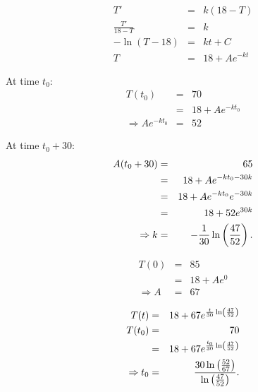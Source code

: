 \begin{frame}

  \begin{eqnarray*}
    T' & = & k(18-T) \\
    \frac{T'}{18-T} & = & k \\
    -\ln(T-18) & = & kt + C \\
    T & = & 18 + A e^{-kt} 
  \end{eqnarray*}

\end{frame}

\begin{frame}

  At time $t_0$:
  \begin{eqnarray*}
    T(t_0) & = & 70 \\
    & = & 18 + Ae^{-kt_0} \\
    \Rightarrow Ae^{-kt_0} & = & 52
  \end{eqnarray*}

  At time $t_0+30$:
  \begin{eqnarray*}
    A(t_0+30) & = & 65 \\
    & = & 18 + A e^{-kt_0-30k} \\
    & = & 18 + A e^{-kt_0} e^{-30k} \\
    & = & 18 + 52 e^{30k} \\
    \Rightarrow k & = & -\frac{1}{30} \ln\left(\frac{47}{52}\right).
  \end{eqnarray*}

\end{frame}


\begin{frame}

  \begin{eqnarray*}
    T(0) & = & 85 \\
    & = & 18 + A e^{0} \\
    \Rightarrow A & = & 67
  \end{eqnarray*}

  \begin{eqnarray*}
    T(t)  & = & 18 + 67 e^{\frac{t}{30} \ln\left(\frac{47}{52}\right)} \\
    T(t_0)& = & 70 \\
    & = & 18 + 67 e^{\frac{t_0}{30} \ln\left(\frac{47}{52}\right)} \\
    \Rightarrow t_0 & = & \frac{30\ln\left(\frac{52}{67}\right)}{\ln\left(\frac{47}{52}\right)}.
  \end{eqnarray*}

\end{frame}




